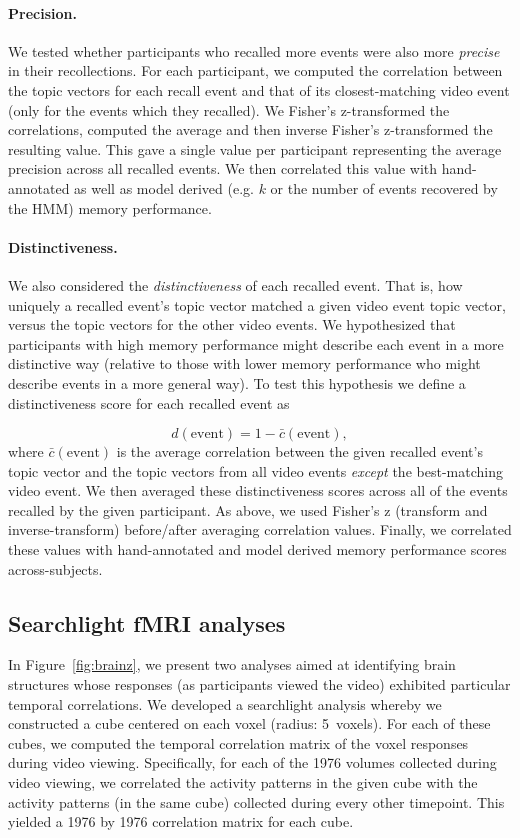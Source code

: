 \documentclass{article}
\begin{document}
\paragraph*{Precision.}
We tested whether participants who recalled more events were also more \textit{precise} in their recollections. For each participant, we computed the correlation between the topic vectors for each recall event and that of its closest-matching video event (only for the events which they recalled). We Fisher's z-transformed the correlations, computed the average and then inverse Fisher's z-transformed the resulting value.  This gave a single value per participant representing the average precision across all recalled events.  We then correlated this value with hand-annotated as well as model derived (e.g. $k$ or the number of events recovered by the HMM) memory performance.

\paragraph*{Distinctiveness.}
We also considered the \textit{distinctiveness} of each recalled event. That is, how uniquely a recalled event's topic vector matched a given video event topic vector, versus the topic vectors for the other video events. We hypothesized that participants with high memory performance might describe each event in a more distinctive way (relative to those with lower memory performance who might describe events in a more general way).  To test this hypothesis we define a distinctiveness score for each recalled event as

\[
  d(\mathrm{event}) = 1 - \bar{c}(\mathrm{event}),
\]
where $\bar{c}(\mathrm{event})$ is the average correlation between the given recalled event's topic vector and the topic vectors from all video events \textit{except} the best-matching video event.  We then averaged these distinctiveness scores across all of the events recalled by the given participant. As above, we used Fisher's z (transform and inverse-transform) before/after averaging correlation values. Finally, we correlated these values with hand-annotated and model derived memory performance scores across-subjects.

\subsection*{Searchlight fMRI analyses}
In Figure~\ref{fig:brainz}, we present two analyses aimed at identifying brain structures whose responses (as participants viewed the video) exhibited particular temporal correlations.  We developed a searchlight analysis whereby we constructed a cube centered on each voxel (radius: 5~voxels).  For each of these cubes, we computed the temporal correlation matrix of the voxel responses during video viewing.  Specifically, for each of the 1976 volumes collected during video viewing, we correlated the activity patterns in the given cube with the activity patterns (in the same cube) collected during every other timepoint.  This yielded a 1976 by 1976 correlation matrix for each cube.
\end{document}
